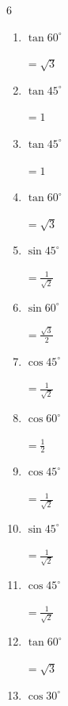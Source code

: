 \begin{multicols}{6}
\begin{enumerate}
        $\displaystyle =\frac{1}{2}$

  \item $\displaystyle \tan{60^\circ}$

        $\displaystyle =\sqrt{3}$

  \item $\displaystyle \tan{45^\circ}$

        $\displaystyle =1$

  \item $\displaystyle \tan{45^\circ}$

        $\displaystyle =1$

  \item $\displaystyle \tan{60^\circ}$

        $\displaystyle =\sqrt{3}$

  \item $\displaystyle \sin{45^\circ}$

        $\displaystyle =\frac{1}{\sqrt{2}}$

  \item $\displaystyle \sin{60^\circ}$

        $\displaystyle =\frac{\sqrt{3}}{2}$

  \item $\displaystyle \cos{45^\circ}$

        $\displaystyle =\frac{1}{\sqrt{2}}$

  \item $\displaystyle \cos{60^\circ}$

        $\displaystyle =\frac{1}{2}$

  \item $\displaystyle \cos{45^\circ}$

        $\displaystyle =\frac{1}{\sqrt{2}}$

  \item $\displaystyle \sin{45^\circ}$

        $\displaystyle =\frac{1}{\sqrt{2}}$

\columnbreak %

\resetques

  \item $\displaystyle \cos{45^\circ}$

        $\displaystyle =\frac{1}{\sqrt{2}}$

  \item $\displaystyle \tan{60^\circ}$

        $\displaystyle =\sqrt{3}$

  \item $\displaystyle \cos{30^\circ}$


\end{enumerate}
\end{multicols}
